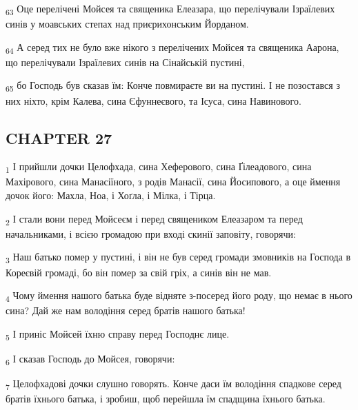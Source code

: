 \begin{tcolorbox}
\textsubscript{63} Оце перелічені Мойсея та священика Елеазара, що перелічували Ізраїлевих синів у моавських степах над приєрихонським Йорданом.
\end{tcolorbox}
\begin{tcolorbox}
\textsubscript{64} А серед тих не було вже нікого з перелічених Мойсея та священика Аарона, що перелічували Ізраїлевих синів на Сінайській пустині,
\end{tcolorbox}
\begin{tcolorbox}
\textsubscript{65} бо Господь був сказав їм: Конче повмираєте ви на пустині. І не позостався з них ніхто, крім Калева, сина Єфуннеєвого, та Ісуса, сина Навинового.
\end{tcolorbox}
\subsection{CHAPTER 27}
\begin{tcolorbox}
\textsubscript{1} І прийшли дочки Целофхада, сина Хеферового, сина Ґілеадового, сина Махірового, сина Манасіїного, з родів Манасії, сина Йосипового, а оце ймення дочок його: Махла, Ноа, і Хоґла, і Мілка, і Тірца.
\end{tcolorbox}
\begin{tcolorbox}
\textsubscript{2} І стали вони перед Мойсеєм і перед священиком Елеазаром та перед начальниками, і всією громадою при вході скинії заповіту, говорячи:
\end{tcolorbox}
\begin{tcolorbox}
\textsubscript{3} Наш батько помер у пустині, і він не був серед громади змовників на Господа в Кореєвій громаді, бо він помер за свій гріх, а синів він не мав.
\end{tcolorbox}
\begin{tcolorbox}
\textsubscript{4} Чому ймення нашого батька буде відняте з-посеред його роду, що немає в нього сина? Дай же нам володіння серед братів нашого батька!
\end{tcolorbox}
\begin{tcolorbox}
\textsubscript{5} І приніс Мойсей їхню справу перед Господнє лице.
\end{tcolorbox}
\begin{tcolorbox}
\textsubscript{6} І сказав Господь до Мойсея, говорячи:
\end{tcolorbox}
\begin{tcolorbox}
\textsubscript{7} Целофхадові дочки слушно говорять. Конче даси їм володіння спадкове серед братів їхнього батька, і зробиш, щоб перейшла їм спадщина їхнього батька.
\end{tcolorbox}
